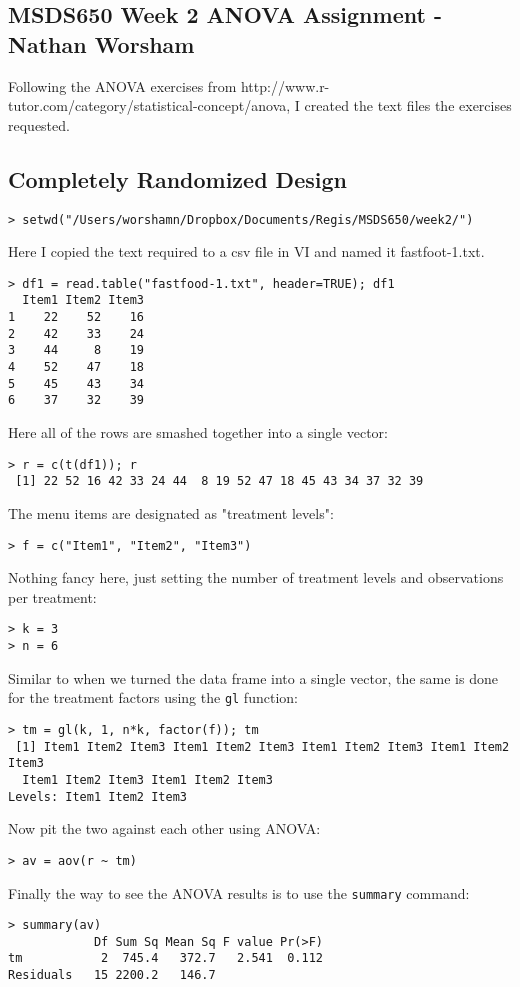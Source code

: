 \documentclass[10pt]{article}
\begin{document}
\subsection*{MSDS650 Week 2 ANOVA Assignment - Nathan Worsham}
Following the ANOVA exercises from http://www.r-tutor.com/category/statistical-concept/anova, I created the text files the exercises requested.
\subsection{Completely Randomized Design}
\begin{verbatim}
> setwd("/Users/worshamn/Dropbox/Documents/Regis/MSDS650/week2/")
\end{verbatim}
Here I copied the text required to a csv file in VI and named it fastfoot-1.txt.
\begin{verbatim}
> df1 = read.table("fastfood-1.txt", header=TRUE); df1
  Item1 Item2 Item3
1    22    52    16
2    42    33    24
3    44     8    19
4    52    47    18
5    45    43    34
6    37    32    39
 \end{verbatim}
 Here all of the rows are smashed together into a single vector:
 \begin{verbatim}
> r = c(t(df1)); r
 [1] 22 52 16 42 33 24 44  8 19 52 47 18 45 43 34 37 32 39
 \end{verbatim}
 The menu items are designated as "treatment levels":
 \begin{verbatim}
> f = c("Item1", "Item2", "Item3") 
 \end{verbatim}
 Nothing fancy here, just setting the number of treatment levels and observations per treatment:
 \begin{verbatim}
> k = 3
> n = 6
\end{verbatim}
 Similar to when we turned the data frame into a single vector, the same is done for the treatment factors using the \verb|gl| function:
 \begin{verbatim}
> tm = gl(k, 1, n*k, factor(f)); tm
 [1] Item1 Item2 Item3 Item1 Item2 Item3 Item1 Item2 Item3 Item1 Item2 Item3
  Item1 Item2 Item3 Item1 Item2 Item3
Levels: Item1 Item2 Item3
\end{verbatim}
 Now pit the two against each other using ANOVA:
 \begin{verbatim}
> av = aov(r ~ tm)
\end{verbatim}
 Finally the way to see the ANOVA results is to use the \verb|summary| command:
 \begin{verbatim}
> summary(av)
            Df Sum Sq Mean Sq F value Pr(>F)
tm           2  745.4   372.7   2.541  0.112
Residuals   15 2200.2   146.7        
\end{verbatim}
\end{document}
